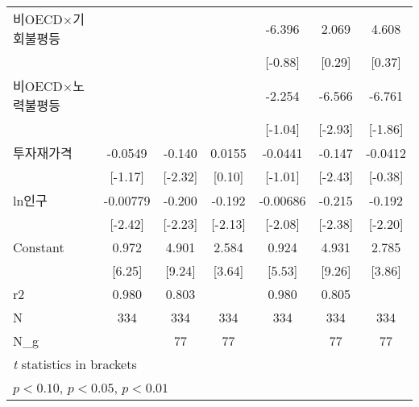 \begin{tabular}{l*{6}{c}}
\addlinespace
비OECD$\times$기회불평등&                     &                     &                     &      -6.396         &       2.069         &       4.608         \\
                    &                     &                     &                     &     [-0.88]         &      [0.29]         &      [0.37]         \\
\addlinespace
비OECD$\times$노력불평등&                     &                     &                     &      -2.254         &      -6.566\sym{***}&      -6.761\sym{*}  \\
                    &                     &                     &                     &     [-1.04]         &     [-2.93]         &     [-1.86]         \\
\addlinespace
투자재가격        &     -0.0549         &      -0.140\sym{**} &      0.0155         &     -0.0441         &      -0.147\sym{**} &     -0.0412         \\
                    &     [-1.17]         &     [-2.32]         &      [0.10]         &     [-1.01]         &     [-2.43]         &     [-0.38]         \\
\addlinespace
ln인구            &    -0.00779\sym{**} &      -0.200\sym{**} &      -0.192\sym{**} &    -0.00686\sym{**} &      -0.215\sym{**} &      -0.192\sym{**} \\
                    &     [-2.42]         &     [-2.23]         &     [-2.13]         &     [-2.08]         &     [-2.38]         &     [-2.20]         \\
\addlinespace
Constant            &       0.972\sym{***}&       4.901\sym{***}&       2.584\sym{***}&       0.924\sym{***}&       4.931\sym{***}&       2.785\sym{***}\\
                    &      [6.25]         &      [9.24]         &      [3.64]         &      [5.53]         &      [9.26]         &      [3.86]         \\
\midrule
r2                  &       0.980         &       0.803         &                     &       0.980         &       0.805         &                     \\
N                   &         334         &         334         &         334         &         334         &         334         &         334         \\
N\_g                 &                     &          77         &          77         &                     &          77         &          77         \\
\bottomrule
\multicolumn{7}{l}{\footnotesize \textit{t} statistics in brackets}\\
\multicolumn{7}{l}{\footnotesize \sym{*} \(p<0.10\), \sym{**} \(p<0.05\), \sym{***} \(p<0.01\)}\\
\end{tabular}
